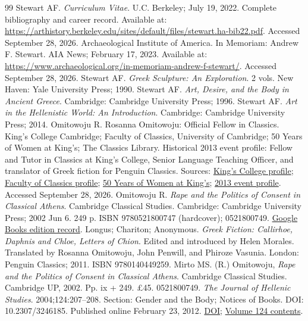\documentclass[numbers]{IntechOpen-Book}
\begin{document}
\begin{backmatter}
\begin{thebibliography}{99}
 Stewart AF. \textit{Curriculum Vitae}. U.C. Berkeley; July 19, 2022. Complete bibliography and career record. Available at: \url{https://arthistory.berkeley.edu/sites/default/files/stewart.ha-bib22.pdf}. Accessed September 28, 2026.
 Archaeological Institute of America. In Memoriam: Andrew F. Stewart. AIA News; February 17, 2023. Available at: \url{https://www.archaeological.org/in-memoriam-andrew-f-stewart/}. Accessed September 28, 2026.
 Stewart AF. \textit{Greek Sculpture: An Exploration}. 2 vols. New Haven: Yale University Press; 1990.
 Stewart AF. \textit{Art, Desire, and the Body in Ancient Greece}. Cambridge: Cambridge University Press; 1996.
 Stewart AF. \textit{Art in the Hellenistic World: An Introduction}. Cambridge: Cambridge University Press; 2014.
 Omitowoju R. Rosanna Omitowoju: Official Fellow in Classics. King's College Cambridge; Faculty of Classics, University of Cambridge; 50 Years of Women at King's; The Classics Library. Historical 2013 event profile: Fellow and Tutor in Classics at King's College, Senior Language Teaching Officer, and translator of Greek fiction for Penguin Classics. Sources: \href{https://www.kings.cam.ac.uk/people/rosanna-omitowoju}{King's College profile}; \href{https://www.classics.cam.ac.uk/people/dr-rosanna-omitowoju}{Faculty of Classics profile}; \href{https://www.50yearsofwomenatkings.com/rosanna-omitowoju}{50 Years of Women at King's}; \href{https://www.theclassicslibrary.com/event/dr-rosanna-omitowoju-to-speak-on-competition-and-aggression-in-ancient-greek-culture-2/}{2013 event profile}. Accessed September 28, 2026.
 Omitowoju R. \textit{Rape and the Politics of Consent in Classical Athens}. Cambridge Classical Studies. Cambridge: Cambridge University Press; 2002 Jun 6. 249 p. ISBN 9780521800747 (hardcover); 0521800749. \href{https://www.google.com/books/edition/Rape_and_the_Politics_of_Consent_in_Clas/U-ng_-4g8EEC?hl=en}{Google Books edition record}.
 Longus; Chariton; Anonymous. \textit{Greek Fiction: Callirhoe, Daphnis and Chloe, Letters of Chion}. Edited and introduced by Helen Morales. Translated by Rosanna Omitowoju, John Penwill, and Phiroze Vasunia. London: Penguin Classics; 2011. ISBN 9780140449259.
 Mirto MS. (R.) Omitowoju, \textit{Rape and the Politics of Consent in Classical Athens}. Cambridge Classical Studies. Cambridge UP, 2002. Pp. ix + 249. £45. 0521800749. \textit{The Journal of Hellenic Studies}. 2004;124:207--208. Section: Gender and the Body; Notices of Books. DOI: 10.2307/3246185. Published online February 23, 2012. \href{https://doi.org/10.2307/3246185}{DOI}; \href{https://www.cambridge.org/core/journals/journal-of-hellenic-studies/volume/2E22A3DCAADA8E3A9C50BE0DB8892277?pageNum=2}{Volume 124 contents}.
\end{thebibliography}
\end{backmatter}
\end{document}
